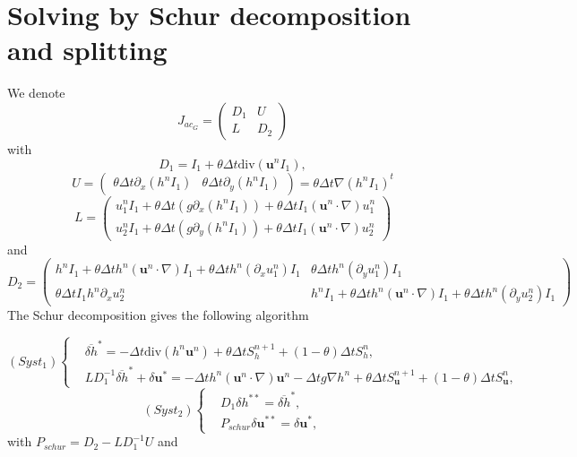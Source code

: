 \documentclass[a4paper, 11pt]{article}
\begin{document}
\section{Solving  by Schur decomposition and splitting}
We denote 
\begin{equation*}
J_{ac_G}=\begin{pmatrix}D_1&U\\L&D_2\end{pmatrix}
\end{equation*}
with
\begin{equation*}
D_1=I_1+\theta\Delta t\text{div}(\boldsymbol{u}^nI_1),
\end{equation*}
\begin{equation*}
U=\begin{pmatrix}\theta\Delta t\partial_x\left(h^nI_1\right)&\theta\Delta t\partial_y\left(h^nI_1\right)\end{pmatrix}=\theta\Delta t\nabla\left(h^nI_1\right)^t
\end{equation*}
\begin{equation*}
L=\begin{pmatrix}
u_1^nI_1+\theta\Delta t (g \partial_x (h^n I_1) )+\theta\Delta tI_1\left(\boldsymbol{u}^n\cdot\nabla\right)u_1^n\\
u_2^nI_1+\theta\Delta t (g \partial_y (h^n I_1) )+\theta\Delta tI_1\left(\boldsymbol{u}^n\cdot\nabla\right)u_2^n
\end{pmatrix}
\end{equation*}
and
\begin{equation*}
D_2=\begin{pmatrix}h^nI_1+\theta\Delta th^n\left(\boldsymbol{u}^n\cdot \nabla\right)I_1+\theta\Delta th^n(\partial_xu_1^n)I_1&\theta\Delta th^n(\partial_yu_1^n)I_1\\
\theta\Delta tI_1h^n\partial_xu_2^n&h^nI_1+\theta\Delta th^n\left(\boldsymbol{u}^n\cdot\nabla\right)I_1+\theta\Delta th^n(\partial_yu_2^n)I_1
\end{pmatrix}
\end{equation*}
The Schur decomposition gives the following algorithm

\begin{equation*}
(Syst_1)\left\{\begin{split}
&\overline{\delta h}^*=-\Delta t\text{div}(h^n\boldsymbol{u}^n)+\theta\Delta tS_h^{n+1}+(1-\theta)\Delta tS_h^{n},\\
&LD_1^{-1}\overline{\delta h}^*+\delta \boldsymbol{u}^*=-\Delta th^n\left(\boldsymbol{u}^n\cdot\nabla\right)\boldsymbol{u}^n-\Delta tg\nabla h^n+\theta\Delta tS_{\boldsymbol{u}}^{n+1}+(1-\theta)\Delta tS_{\boldsymbol{u}}^n,
\end{split}\right.
\end{equation*}
\begin{equation*}
(Syst_2)\left\{\begin{split}
&D_1\delta h^{**}=\overline{\delta h}^*,\\
&P_{schur}\delta \boldsymbol{u}^{**}=\delta \boldsymbol{u}^{*},
\end{split}
\right.
\end{equation*}
with  $P_{schur}=D_2-LD_1^{-1}U$
and
\end{document}
